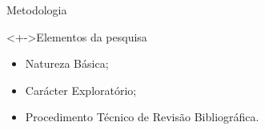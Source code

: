 	\begin{frame}{Metodologia} %
		\begin{block}<+->{Elementos da pesquisa}
			\justify
		 	\begin{itemize}[<+->]
				\item Natureza Básica;
				\item Carácter Exploratório;
				\item Procedimento Técnico de Revisão Bibliográfica.
			\end{itemize}
		\end{block}
	\end{frame} %













